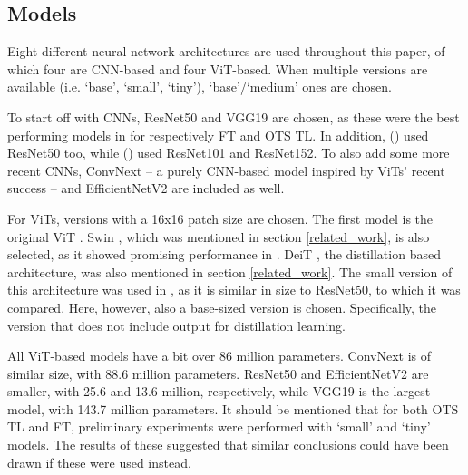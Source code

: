 \subsection{Models} \label{methods:models}
Eight different neural network architectures are used throughout this paper, of which four are CNN-based and four ViT-based. When multiple versions are available (i.e. `base', `small', `tiny'), `base'/`medium' ones are chosen.

To start off with CNNs, ResNet50 \citep{he2016deep} and VGG19 \citep{simonyan2014very} are chosen, as these were the best performing models in \citeauthor{sabatelli2018deep} for respectively FT and OTS TL. In addition, \citeauthor{matsoukas2021time} (\citeyear{matsoukas2021time}) used ResNet50 too, while \citeauthor{zhou2021convnets} (\citeyear{zhou2021convnets}) used ResNet101 and ResNet152. To also add some more recent CNNs, ConvNext \citep{liu2022convnet} -- a purely CNN-based model inspired by ViTs' recent success -- and EfficientNetV2 \citep{tan2021efficientnetv2} are included as well.

For ViTs, versions with a 16x16 patch size are chosen. The first model is the original ViT \citep{dosovitskiy2020image}. Swin \citep{liu2021swin}, which was mentioned in section \ref{related_work}, is also selected, as it showed promising performance in \citeauthor{zhou2021convnets}. DeiT \citep{touvron2021training}, the distillation based architecture, was also mentioned in section \ref{related_work}. The small version of this architecture was used in \citeauthor{matsoukas2021time}, as it is similar in size to ResNet50, to which it was compared. Here, however, also a base-sized version is chosen. Specifically, the version that does not include output for distillation learning.

All ViT-based models have a bit over 86 million parameters. ConvNext is of similar size, with 88.6 million parameters. ResNet50 and EfficientNetV2 are smaller, with 25.6 and 13.6 million, respectively, while VGG19 is the largest model, with 143.7 million parameters. It should be mentioned that for both OTS TL and FT, preliminary experiments were performed with `small' and `tiny' models. The results of these suggested that similar conclusions could have been drawn if these were used instead.


